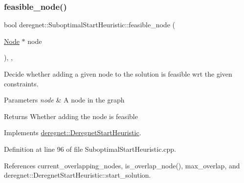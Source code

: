 \subsubsection{\texorpdfstring{feasible\+\_\+node()}{feasible\_node()}}
{\footnotesize\ttfamily bool deregnet\+::\+Suboptimal\+Start\+Heuristic\+::feasible\+\_\+node (\begin{DoxyParamCaption}\item[{\hyperlink{namespacederegnet_a744bad34f2de9856d36715a445f027f3}{Node} $\ast$}]{node }\end{DoxyParamCaption})\hspace{0.3cm}{\ttfamily [override]}, {\ttfamily [private]}, {\ttfamily [virtual]}}



Decide whether adding a given node to the solution is feasible wrt the given constraints. 


\begin{DoxyParams}{Parameters}
{\em node} & A node in the graph\\
\hline
\end{DoxyParams}
\begin{DoxyReturn}{Returns}
Whether adding the node is feasible 
\end{DoxyReturn}


Implements \hyperlink{classderegnet_1_1DeregnetStartHeuristic_ac296c4f122f7d3ad2fcc2cbb0d1b5379}{deregnet\+::\+Deregnet\+Start\+Heuristic}.



Definition at line 96 of file Suboptimal\+Start\+Heuristic.\+cpp.



References current\+\_\+overlapping\+\_\+nodes, is\+\_\+overlap\+\_\+node(), max\+\_\+overlap, and deregnet\+::\+Deregnet\+Start\+Heuristic\+::start\+\_\+solution.


